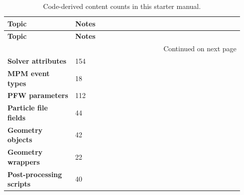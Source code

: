 {\renewcommand{\arraystretch}{1.15}
\small
\begin{longtable}{@{}p{0.27\linewidth}p{0.67\linewidth}@{}}
\caption{Code-derived content counts in this starter manual.}\label{tab:source-counts}\\
\toprule
\textbf{Topic} & \textbf{Notes}\\
\midrule
\endfirsthead
\toprule
\textbf{Topic} & \textbf{Notes}\\
\midrule
\endhead
\midrule
\multicolumn{2}{r}{Continued on next page}\\
\endfoot
\bottomrule
\endlastfoot
\textbf{Solver attributes} & 154\\
\textbf{MPM event types} & 18\\
\textbf{PFW parameters} & 112\\
\textbf{Particle file fields} & 44\\
\textbf{Geometry objects} & 42\\
\textbf{Geometry wrappers} & 22\\
\textbf{Post-processing scripts} & 40\\
\end{longtable}
}

